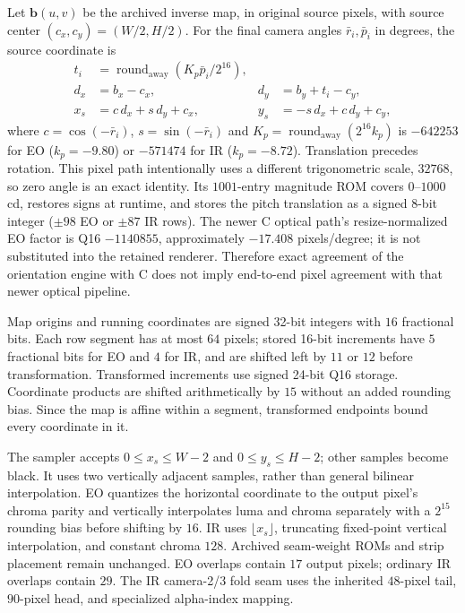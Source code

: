 Let $\boldsymbol b(u,v)$ be the archived inverse map, in original source
pixels, with source center $(c_x,c_y)=(W/2,H/2)$. For the final camera
angles $\bar r_i,\bar p_i$ in degrees, the source coordinate is
\begin{align}
 t_i&=\operatorname{round}_{\mathrm{away}}(K_p\bar p_i/2^{16}),\\
 d_x&=b_x-c_x, & d_y&=b_y+t_i-c_y,\\
 x_s&=c\,d_x+s\,d_y+c_x,&
 y_s&=-s\,d_x+c\,d_y+c_y,
 \label{eq:gl_map_affine}
\end{align}
where $c=\cos(-\bar r_i)$, $s=\sin(-\bar r_i)$ and
$K_p=\operatorname{round}_{\mathrm{away}}(2^{16}k_p)$ is $-642253$ for EO
($k_p=-9.80$) or $-571474$ for IR ($k_p=-8.72$).
Translation precedes rotation.
This pixel path intentionally uses a different trigonometric scale,
$32768$, so zero angle is an exact identity. Its $1001$-entry magnitude
ROM covers $0$--$1000$ cd, restores signs at runtime, and stores the pitch
translation as a signed 8-bit integer ($\pm98$ EO or $\pm87$ IR rows).
The newer C optical path's resize-normalized EO factor is Q16
$-1140855$, approximately $-17.408$ pixels/degree; it is not substituted
into the retained renderer. Therefore exact agreement of the orientation
engine with C does not imply end-to-end pixel agreement with that newer
optical pipeline.

Map origins and running coordinates are signed 32-bit integers with
$16$ fractional bits. Each row segment has at most $64$ pixels; stored
16-bit increments have $5$ fractional bits for EO and $4$ for IR, and
are shifted left by $11$ or $12$ before transformation. Transformed
increments use signed 24-bit Q16 storage. Coordinate products are shifted
arithmetically by $15$ without an added rounding bias. Since the map is
affine within a segment, transformed endpoints bound every coordinate in it.

The sampler accepts $0\le x_s\le W-2$ and $0\le y_s\le H-2$; other
samples become black. It uses two vertically adjacent samples, rather than
general bilinear interpolation. EO quantizes the horizontal coordinate to
the output pixel's chroma parity and vertically interpolates luma and chroma
separately with a $2^{15}$ rounding bias before shifting by $16$. IR uses
$\lfloor x_s\rfloor$, truncating fixed-point vertical interpolation, and
constant chroma $128$. Archived seam-weight ROMs and strip placement remain
unchanged. EO overlaps contain $17$ output pixels; ordinary IR overlaps
contain $29$. The IR camera-2/3 fold seam uses the inherited $48$-pixel tail,
$90$-pixel head, and specialized alpha-index mapping.

